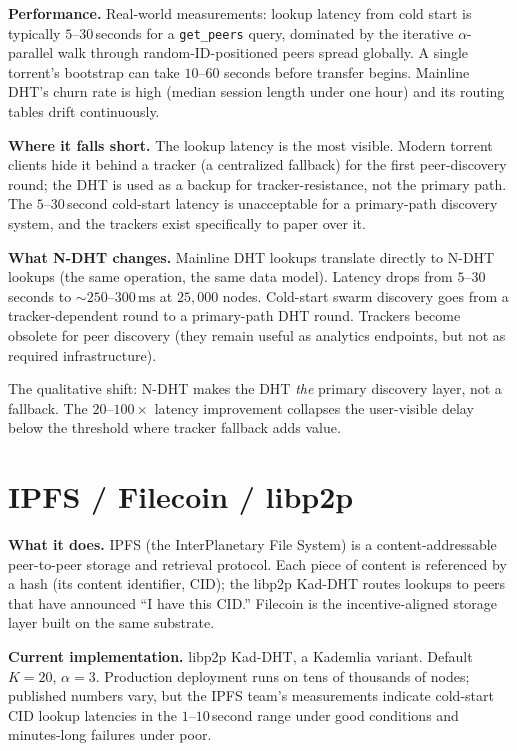 \documentclass[twoside,nobib]{tufte-book}
\newcommand{\NDHT}{N-DHT\xspace}
\begin{document}
\textbf{Performance.} Real-world measurements: lookup latency
from cold start is typically $5$--$30$\,seconds for a
\texttt{get\_peers} query, dominated by the iterative
$\alpha$-parallel walk through random-ID-positioned peers
spread globally. A single torrent's bootstrap can take
$10$--$60$ seconds before transfer begins. Mainline DHT's
churn rate is high (median session length under one hour) and
its routing tables drift continuously.

\textbf{Where it falls short.} The lookup latency is the most
visible. Modern torrent clients hide it behind a tracker (a
centralized fallback) for the first peer-discovery round; the
DHT is used as a backup for tracker-resistance, not the primary
path. The $5$--$30$\,second cold-start latency is unacceptable
for a primary-path discovery system, and the trackers exist
specifically to paper over it.

\textbf{What \NDHT changes.} Mainline DHT lookups translate
directly to \NDHT lookups (the same operation, the same data
model). Latency drops from $5$--$30$\,seconds to
$\sim 250$--$300$\,ms at $25{,}000$ nodes. Cold-start swarm
discovery goes from a tracker-dependent round to a primary-path
DHT round. Trackers become obsolete for peer discovery (they
remain useful as analytics endpoints, but not as required
infrastructure).

The qualitative shift: \NDHT makes the DHT \emph{the} primary
discovery layer, not a fallback. The $20$--$100\times$ latency
improvement collapses the user-visible delay below the threshold
where tracker fallback adds value.

\section{IPFS / Filecoin / libp2p}

\textbf{What it does.} IPFS (the InterPlanetary File System) is
a content-addressable peer-to-peer storage and retrieval
protocol. Each piece of content is referenced by a hash (its
content identifier, CID); the libp2p Kad-DHT routes lookups to
peers that have announced ``I have this CID.'' Filecoin is the
incentive-aligned storage layer built on the same substrate.

\textbf{Current implementation.} libp2p Kad-DHT, a Kademlia
variant. Default $K = 20$, $\alpha = 3$. Production deployment
runs on tens of thousands of nodes; published numbers vary, but
the IPFS team's measurements indicate cold-start CID lookup
latencies in the $1$--$10$\,second range under good conditions
and minutes-long failures under
poor.
\end{document}
